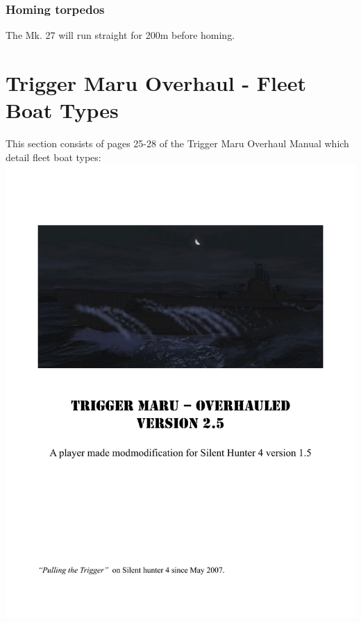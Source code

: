 \documentclass{article}
\begin{document}
\subsubsection{Homing torpedos}
The Mk. 27 will run straight for 200m before homing.

\section{Trigger Maru Overhaul - Fleet Boat Types}
This section consists of pages 25-28 of the Trigger Maru Overhaul Manual which detail fleet boat types:
\includegraphics[page={25}, width=\textwidth, height=.95\textheight]{TMO_Manual}
\end{document}
